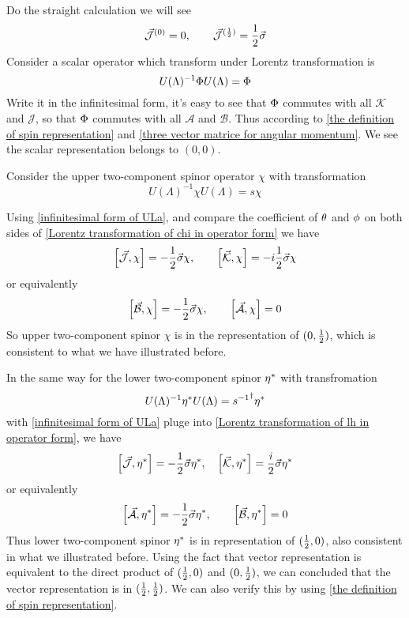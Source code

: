 Do the straight calculation we will see
\begin{equation}
  \vec{\mathcal{J}}^{(0)} = 0, \qquad
  \vec{\mathcal{J}}^{(\frac{1}{2})} = \frac{1}{2} \vec{\sigma}
\end{equation}
Consider a scalar operator which transform under Lorentz transformation is
\begin{equation}
  U(\Lambda)^{-1} \Phi U(\Lambda) = \Phi
\end{equation}
Write it in the infinitesimal form, it's easy to see that $\Phi$ commutes with all $\mathcal{K}$ and $\mathcal{J}$, so that  $\Phi$ commutes with all $\mathcal{A}$ and $\mathcal{B}$. Thus according to \eqref{the definition of spin representation} and \eqref{three vector matrice for angular momentum}. We see the scalar representation belongs to $(0,0)$.

Consider the upper two-component spinor operator $\chi$ with transformation
\begin{equation} \label{Lorentz transformation of chi in operator form}
U(\Lambda)^{-1}\chi U(\Lambda) = s \chi
\end{equation}

Using \eqref{infinitesimal form of ULa}, and compare the coefficient of $\theta$ and $\phi$ on both sides of \eqref{Lorentz transformation of chi in operator form} we have
\begin{equation}
  \comm{\vec{\mathcal{J}}}{\chi} = -\half \vec{\s}\chi,\qquad
\comm{\vec{\mathcal{K}}}{\chi} = - i\half \vec{\s}\chi
\end{equation}
or equivalently
\begin{equation}
  \comm{\vec{\mathcal{B}}}{\chi} =- \half \vec{\s}\chi,\qquad
\comm{\vec{\mathcal{A}}}{\chi} =0
\end{equation}
So upper two-component spinor $\chi$ is in the representation of $(0,\frac{1}{2})$, which is consistent to what we have illustrated before.

In the same way for the lower two-component spinor ${\eta^*}$ with transfromation
\begin{equation} \label{Lorentz transformation of lh in operator form}
U(\Lambda)^{-1}{\eta^*} U(\Lambda) = {s^{-1}}^{\dagger} {\eta^*}
\end{equation}
with \eqref{infinitesimal form of ULa} pluge into \eqref{Lorentz transformation of lh in operator form}, we have
\begin{equation}
  \comm{\vec{\mathcal{J}}}{\lh}=-\half\vec{\s}\lh,\quad
\comm{\vec{\mathcal{K}}}{\lh} = \frac{i}{2}\vec{\s}\lh
\end{equation}
or equivalently
\begin{equation}
  \comm{\vec{\mathcal{A}}}{\lh} = -\half \vec{\s}\lh,\qquad
\comm{\vec{\mathcal{B}}}{\lh} =0
\end{equation}
Thus lower two-component spinor ${\eta^*}$ is in representation of $(\frac{1}{2},0)$, also consistent in what we illustrated before.
Using the fact that vector representation is equivalent to the direct product of $(\frac{1}{2},0)$ and $(0,\frac{1}{2})$, we can concluded that the vector representation is in $(\frac{1}{2},\frac{1}{2})$. We can also verify this by using \eqref{the definition of spin representation}.

